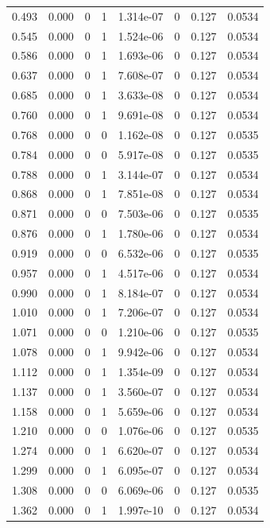 \documentclass[preview]{standalone}
\begin{document}
{{\begin{tabular}{L{1.2cm}C{1.2cm} C{0.3cm}C{0.5cm} C{1.4cm}C{1.4cm} C{1.4cm}C{1.4cm}}
  0.493  &  0.000  & 0     &  1 &  1.314e-07  & 0  & 0.127 &  0.0534   \\ 
  0.545  &  0.000  & 0     &  1 &  1.524e-06  & 0  & 0.127 &  0.0534   \\ 
  0.586  &  0.000  & 0     &  1 &  1.693e-06  & 0  & 0.127 &  0.0534   \\ 
  0.637  &  0.000  & 0     &  1 &  7.608e-07  & 0  & 0.127 &  0.0534   \\ 
  0.685  &  0.000  & 0     &  1 &  3.633e-08  & 0  & 0.127 &  0.0534   \\ 
  0.760  &  0.000  & 0     &  1 &  9.691e-08  & 0  & 0.127 &  0.0534   \\ 
  0.768  &  0.000  & 0     &  0 &  1.162e-08  & 0  & 0.127 &  0.0535   \\ 
  0.784  &  0.000  & 0     &  0 &  5.917e-08  & 0  & 0.127 &  0.0535   \\ 
  0.788  &  0.000  & 0     &  1 &  3.144e-07  & 0  & 0.127 &  0.0534   \\ 
  0.868  &  0.000  & 0     &  1 &  7.851e-08  & 0  & 0.127 &  0.0534   \\ 
  0.871  &  0.000  & 0     &  0 &  7.503e-06  & 0  & 0.127 &  0.0535   \\ 
  0.876  &  0.000  & 0     &  1 &  1.780e-06  & 0  & 0.127 &  0.0534   \\ 
  0.919  &  0.000  & 0     &  0 &  6.532e-06  & 0  & 0.127 &  0.0535   \\ 
  0.957  &  0.000  & 0     &  1 &  4.517e-06  & 0  & 0.127 &  0.0534   \\ 
  0.990  &  0.000  & 0     &  1 &  8.184e-07  & 0  & 0.127 &  0.0534   \\ 
  1.010  &  0.000  & 0     &  1 &  7.206e-07  & 0  & 0.127 &  0.0534   \\ 
  1.071  &  0.000  & 0     &  0 &  1.210e-06  & 0  & 0.127 &  0.0535   \\ 
  1.078  &  0.000  & 0     &  1 &  9.942e-06  & 0  & 0.127 &  0.0534   \\ 
  1.112  &  0.000  & 0     &  1 &  1.354e-09  & 0  & 0.127 &  0.0534   \\ 
  1.137  &  0.000  & 0     &  1 &  3.560e-07  & 0  & 0.127 &  0.0534   \\ 
  1.158  &  0.000  & 0     &  1 &  5.659e-06  & 0  & 0.127 &  0.0534   \\ 
  1.210  &  0.000  & 0     &  0 &  1.076e-06  & 0  & 0.127 &  0.0535   \\ 
  1.274  &  0.000  & 0     &  1 &  6.620e-07  & 0  & 0.127 &  0.0534   \\ 
  1.299  &  0.000  & 0     &  1 &  6.095e-07  & 0  & 0.127 &  0.0534   \\ 
  1.308  &  0.000  & 0     &  0 &  6.069e-06  & 0  & 0.127 &  0.0535   \\ 
  1.362  &  0.000  & 0     &  1 &  1.997e-10  & 0  & 0.127 &  0.0534   \\ 
\hline 
\end{tabular} 

}}
\end{document}
